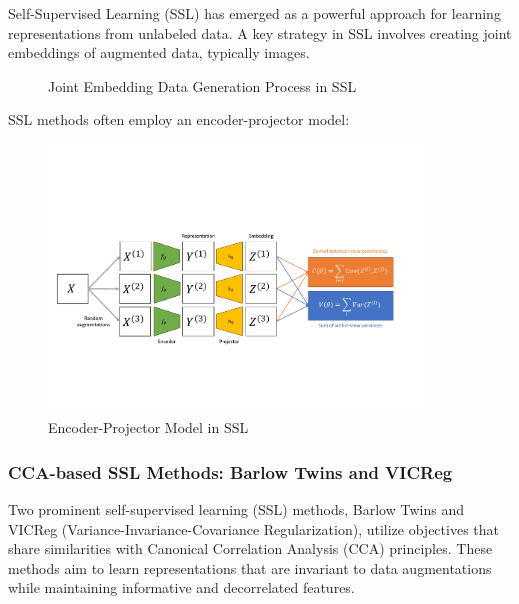 Self-Supervised Learning (SSL) has emerged as a powerful approach for learning representations from unlabeled data. A key strategy in SSL involves creating joint embeddings of augmented data, typically images.

\begin{figure}
\centering
{}
\caption{Joint Embedding Data Generation Process in SSL}
\label{fig:joint_embedding}
\end{figure}

SSL methods often employ an encoder-projector model:

\begin{figure}
\centering
\includegraphics[width=0.9\textwidth]{figures/ssl_schematic}
\caption{Encoder-Projector Model in SSL}
\label{fig:sslschematic}
\end{figure}

\subsubsection{CCA-based SSL Methods: Barlow Twins and VICReg}

Two prominent self-supervised learning (SSL) methods, Barlow Twins and VICReg (Variance-Invariance-Covariance Regularization), utilize objectives that share similarities with Canonical Correlation Analysis (CCA) principles. These methods aim to learn representations that are invariant to data augmentations while maintaining informative and decorrelated features.

